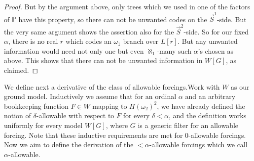 \documentclass[a4paper,11pt]{article}
\newcommand{\forceP}{\mathbb{P}}
\begin{document}
\begin{proof}
But by the argument above, only trees which we used in one of the factors of $\forceP$ have this property, so there can not be unwanted codes on the $\vec{S}^1$-side. But the very same argument shows the assertion also for the $\vec{S}^2$-side. So for our fixed $\alpha$, there is no real $r$ which codes an $\omega_1$ branch over $L[r]$. But any unwanted information would need not only one but even $\aleph_1$-many such $\alpha$'s chosen as above. This shows that there can not be unwanted information in $W[G]$, as claimed.


\end{proof}


We define next a derivative of the class of allowable forcings.Work with $W$ as our ground model.  Inductively we assume that for an ordinal $\alpha$ and an arbitrary bookkeeping function $F \in W$ mapping to $H(\omega_2)^2$, we have already defined the notion of $\delta$-allowable with respect to $F$ for every $\delta < \alpha$, and the definition works uniformly for every model $W[G]$, where $G$ is a generic filter for an allowable forcing. Note that these inductive requirements are met for 0-allowable forcings. Now we aim to define the derivation of the $<\alpha$-allowable forcings which we call $\alpha$-allowable.
\end{document}
